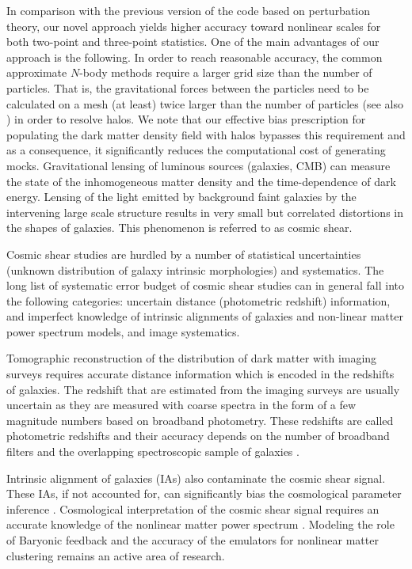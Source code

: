 In comparison with the previous version of the code based on perturbation theory, our novel approach yields higher accuracy toward nonlinear scales for both two-point 
and three-point statistics. One of the main advantages of our approach is the following. In order to reach reasonable accuracy, the common approximate $N$-body methods \citep{qpm,fastpm,ice_cola} require a larger grid size than the number of particles. That is, the gravitational forces between the particles need to be calculated on a mesh (at least) twice larger than the number of particles (see also \citealt{nifty,monaco2016}) in order to resolve halos. We note that our effective bias prescription for populating the dark matter density field with halos bypasses this requirement and as a consequence, it significantly reduces the computational cost of generating mocks.      
Gravitational lensing of luminous sources (galaxies, CMB) can measure 
the state of the inhomogeneous matter density and the time-dependence of dark energy. 
Lensing of the light emitted by background faint galaxies by the intervening large scale structure 
results in very small but correlated distortions in the shapes of galaxies. This phenomenon is referred to 
as cosmic shear.

Cosmic shear studies are hurdled by a number of statistical uncertainties (unknown distribution 
of galaxy intrinsic morphologies) and systematics. The long list of systematic error budget 
of cosmic shear studies can in general fall into the following categories: uncertain distance 
(photometric redshift) information, and imperfect knowledge of intrinsic alignments of galaxies and non-linear matter 
power spectrum models, and image systematics. 

Tomographic reconstruction of the distribution of dark matter with imaging surveys requires 
accurate distance information which is encoded in the redshifts of galaxies. 
The redshift that are estimated from the imaging surveys are usually uncertain as they are measured with coarse 
spectra in the form of a few magnitude numbers based on broadband photometry. These redshifts are called 
photometric redshifts and their accuracy depends on the number of broadband filters and the overlapping spectroscopic 
sample of galaxies \citep{bonnett2016,choi2016,boris2016,hildebrandt2017}. %

Intrinsic alignment of galaxies (IAs) also contaminate the cosmic shear signal. These IAs, if not accounted for, 
can significantly bias the cosmological parameter inference \citep{codis2015,joachimi2015, kirk2015,krause_ia}. 
Cosmological interpretation of the cosmic shear signal requires an accurate knowledge of the nonlinear 
matter power spectrum \citep{semboloni2013, eifler2015, schaye2015, joudaki2016, kitching2016, mead2016}. Modeling the role of 
Baryonic feedback and the accuracy of the emulators for nonlinear matter clustering remains an active area of research. 

